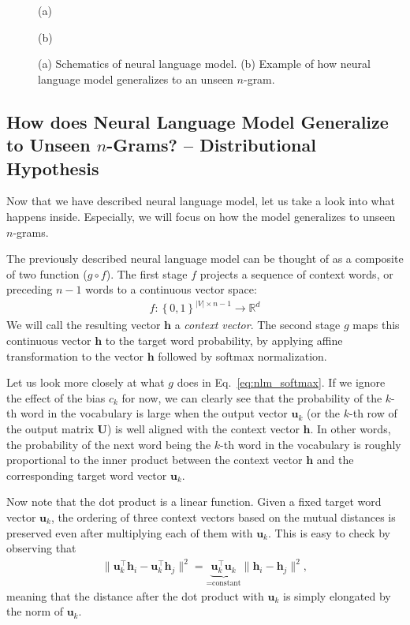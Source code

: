 \documentclass{report}
\newcommand{\vect}[1]{\mathbf{#1}}
\newcommand{\matr}[1]{\mathbf{#1}}
\newcommand{\vh}[0]{\vect{h}}
\newcommand{\vu}[0]{\vect{u}}
\newcommand{\mU}[0]{\matr{U}}
\newcommand{\RR}[0]{\mathbb{R}}
\begin{document}
\begin{figure}[t]
\begin{minipage}[!b]{0.49\textwidth}
    \end{minipage}
    \begin{minipage}[!b]{0.49\textwidth}
        \centering
        (a)
    \end{minipage}
    \begin{minipage}[!b]{0.49\textwidth}
        \centering
        (b)
    \end{minipage}
    \caption{(a) Schematics of neural language model. (b) Example of how neural language model generalizes to an unseen
    $n$-gram.}
    \label{fig:nlm}
\end{figure}

\subsection{How does Neural Language Model Generalize to Unseen $n$-Grams? --
Distributional Hypothesis}
\label{sec:distributional}

Now that we have described neural language model, let us take a look into what
happens inside. Especially, we will focus on how the model generalizes to unseen
$n$-grams.

The previously described neural language model can be thought of as a composite
of two function ($g \circ f$). The first stage $f$ projects a sequence of
context words, or preceding $n-1$ words to a continuous vector space:
\begin{align*}
    f: \left\{ 0, 1\right\}^{|V| \times n-1} \to \RR^d
\end{align*}
We will call the resulting vector $\vh$ a {\em context vector}.
The second stage $g$ maps this continuous vector $\vh$ to the target word
probability, by applying affine transformation to the vector $\vh$ followed by
softmax normalization. 

Let us look more closely at what $g$ does in Eq.~\eqref{eq:nlm_softmax}. If we
ignore the effect of the bias $c_k$ for now, we can clearly see that the
probability of the $k$-th word in the vocabulary is large when the output vector
$\vu_k$ (or the $k$-th row of the output matrix $\mU$) is well aligned with the
context vector $\vh$. In other words, the probability of the next word being the
$k$-th word in the vocabulary is roughly proportional to the inner product
between the context vector $\vh$ and the corresponding target word vector
$\vu_k$.

Now note that the dot product is a linear function. Given a fixed target word
vector $\vu_k$, the ordering of three context vectors based on the mutual
distances is preserved even after multiplying each of them with $\vu_k$. This is
easy to check by observing that
\begin{align*}
    \| \vu_k^\top \vh_i - \vu_k^\top \vh_j \|^2 = \underbrace{\vu_k^\top
    \vu_k}_{=\text{constant}} \| \vh_i -
    \vh_j \|^2,
\end{align*}
meaning that the distance after the dot product with $\vu_k$ is simply elongated
by the norm of $\vu_k$.
\end{document}

